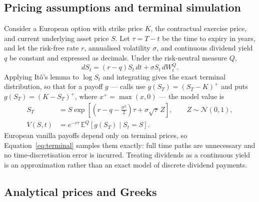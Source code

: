\documentclass[11pt,a4paper]{article}
\begin{document}
\subsection{Pricing assumptions and terminal simulation}

Consider a European option with strike price \(K\), the contractual
exercise price, and current underlying asset price \(S\). Let \(\tau=T-t\)
be the time to expiry in years, and let the risk-free rate \(r\), annualised
volatility \(\sigma\), and continuous dividend yield \(q\) be constant and
expressed as decimals. Under the risk-neutral measure \(Q\),
\begin{equation}
 dS_t=(r-q)S_t\,dt+\sigma S_t\,dW_t^Q.
 \label{eq:sde}
\end{equation}
Applying It\^o's lemma to \(\log S_t\) and integrating gives the exact
terminal distribution, so that for a payoff \(g\) --- calls use
\(g(S_T)=(S_T-K)^+\) and puts \(g(S_T)=(K-S_T)^+\), where \(x^+=\max(x,0)\)
--- the model value is
\begin{align}
 S_T&=S\exp\left[\left(r-q-\frac{\sigma^2}{2}\right)\tau
       +\sigma\sqrt{\tau}\,Z\right],\qquad Z\sim\mathcal N(0,1),
 \label{eq:terminal}\\
 V(S,t)&=e^{-r\tau}\,\mathbb E^Q\!\left[g(S_T)\mid S_t=S\right].
 \label{eq:expectation}
\end{align}
European vanilla payoffs depend only on terminal prices, so
Equation~\eqref{eq:terminal} samples them exactly: full time paths are
unnecessary and no time-discretisation error is incurred. Treating
dividends as a continuous yield is an approximation rather than an exact
model of discrete dividend payments.

\subsection{Analytical prices and Greeks}
\end{document}
